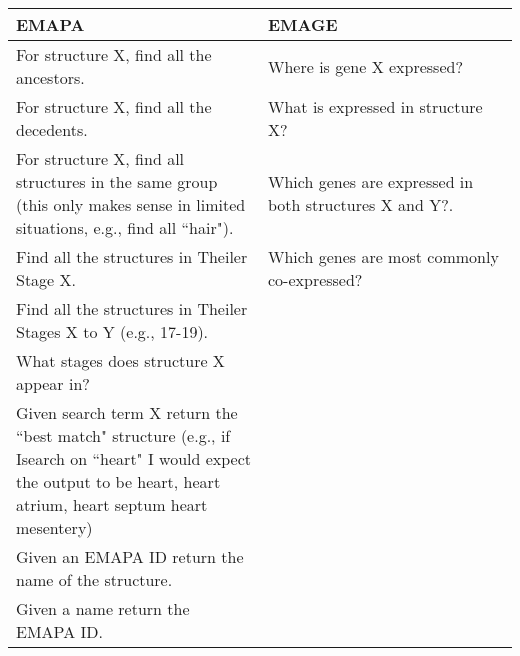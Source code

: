 \begin{center}
    \begin{tabular}{ | p{0.5\linewidth} | p{0.5\linewidth}|}
    \hline
    \textbf{EMAPA} & \textbf{EMAGE} \\ \hline
    For structure X, find all the ancestors. &  Where is gene X expressed? \\ \hline
    For structure X, find all the decedents. &  What is expressed in structure X? \\ \hline
    For structure X, find all structures in the same group (this only makes sense in limited situations, e.g., find all ``hair"). & Which genes are expressed in both structures X and Y?. \\ \hline
    Find all the structures in Theiler Stage X. & Which genes are most commonly co-expressed? \\ \hline
    Find all the structures in Theiler Stages X to Y (e.g., 17-19). &  \\ \hline
    What stages does structure X appear in? & \\ \hline
    Given search term X return the ``best match" structure (e.g., if Isearch on ``heart" I would expect the output to be heart, heart atrium, heart septum  heart mesentery) & \\ \hline
    Given an EMAPA ID return the name of the structure. &  \\ \hline
    Given a name return the EMAPA ID. &  \\ \hline
    \end{tabular}
\end{center}
\parindent 15pt
